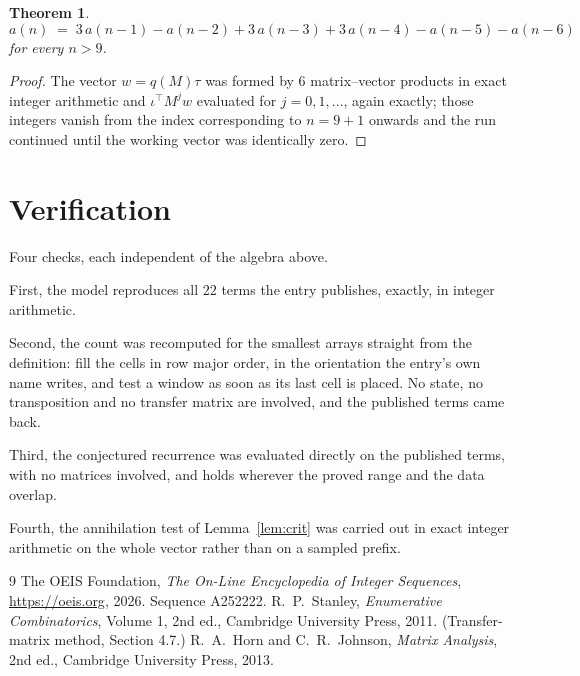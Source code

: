 \documentclass[11pt,a4paper]{article}
\theoremstyle{plain}
\newtheorem{theorem}{Theorem}
\theoremstyle{definition}
\begin{document}
\begin{theorem}
\[
a(n)\;=\;3\,a(n-1) - a(n-2) + 3\,a(n-3) + 3\,a(n-4) - a(n-5) - a(n-6)
\]
for every $n>9$.
\end{theorem}

\begin{proof}
The vector $w=q(M)\tau$ was formed by $6$ matrix--vector products in exact integer
arithmetic and $\iota^{\!\top}M^{j}w$ evaluated for $j=0,1,\dots$, again exactly; those
integers vanish from the index corresponding to $n=9+1$ onwards and the run continued
until the working vector was identically zero.
\end{proof}

\section{Verification}

Four checks, each independent of the algebra above.

First, the model reproduces all $22$ terms the entry publishes, exactly, in integer
arithmetic.

Second, the count was recomputed for the smallest arrays straight from the definition: fill the
cells in row major order, in the orientation the entry's own name writes, and test a window as
soon as its last cell is placed. No state, no transposition and no transfer matrix are
involved, and the published terms came back.

Third, the conjectured recurrence was evaluated directly on the published terms, with no
matrices involved, and holds wherever the proved range and the data overlap.

Fourth, the annihilation test of Lemma~\ref{lem:crit} was carried out in exact integer
arithmetic on the whole vector rather than on a sampled prefix.

\begin{thebibliography}{9}
 The OEIS Foundation, \emph{The On-Line Encyclopedia of Integer
Sequences}, \url{https://oeis.org}, 2026. Sequence A252222.
 R.~P.~Stanley, \emph{Enumerative Combinatorics}, Volume 1, 2nd ed.,
Cambridge University Press, 2011. (Transfer-matrix method, Section 4.7.)
 R.~A.~Horn and C.~R.~Johnson, \emph{Matrix Analysis}, 2nd ed., Cambridge
University Press, 2013.
\end{thebibliography}
\end{document}
